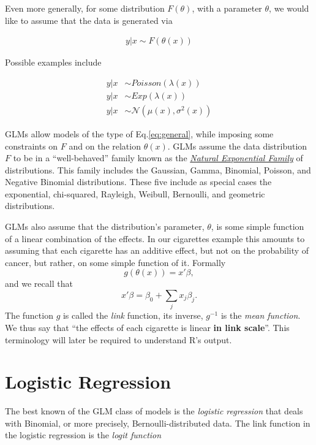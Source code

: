\documentclass[]{book}
\theoremstyle{definition}
\theoremstyle{definition}
\theoremstyle{definition}
\theoremstyle{remark}
\begin{document}
Even more generally, for some distribution \(F(\theta)\), with a
parameter \(\theta\), we would like to assume that the data is generated
via

\begin{align}
  \label{eq:general}
  y|x \sim F(\theta(x))
\end{align}

Possible examples include

\begin{align}
 y|x &\sim Poisson(\lambda(x)) \\
 y|x &\sim Exp(\lambda(x)) \\
 y|x &\sim \mathcal{N}(\mu(x),\sigma^2(x)) 
\end{align}

GLMs allow models of the type of Eq.\eqref{eq:general}, while imposing
some constraints on \(F\) and on the relation \(\theta(x)\). GLMs assume
the data distribution \(F\) to be in a ``well-behaved'' family known as
the
\href{https://en.wikipedia.org/wiki/Natural_exponential_family}{\emph{Natural
Exponential Family}} of distributions. This family includes the
Gaussian, Gamma, Binomial, Poisson, and Negative Binomial distributions.
These five include as special cases the exponential, chi-squared,
Rayleigh, Weibull, Bernoulli, and geometric distributions.

GLMs also assume that the distribution's parameter, \(\theta\), is some
simple function of a linear combination of the effects. In our
cigarettes example this amounts to assuming that each cigarette has an
additive effect, but not on the probability of cancer, but rather, on
some simple function of it. Formally \[g(\theta(x))=x'\beta,\] and we
recall that \[x'\beta=\beta_0 + \sum_j x_j \beta_j.\] The function \(g\)
is called the \emph{link} function, its inverse, \(g^{-1}\) is the
\emph{mean function}. We thus say that ``the effects of each cigarette
is linear \textbf{in link scale}''. This terminology will later be
required to understand R's output.

\section{Logistic Regression}\label{logistic-regression}

The best known of the GLM class of models is the \emph{logistic
regression} that deals with Binomial, or more precisely,
Bernoulli-distributed data. The link function in the logistic regression
is the \emph{logit function}
\end{document}
